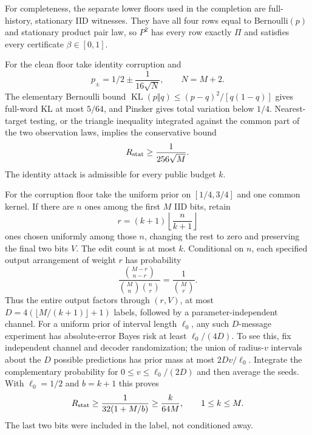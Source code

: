 For completeness, the separate lower floors used in the completion are full-history, stationary IID witnesses. They have all four rows equal to Bernoulli$(p)$ and stationary product pair law, so $P^2$ has every row exactly $\Pi$ and satisfies every certificate $\beta\in[0,1]$.

For the clean floor take identity corruption and
\[
 p_\pm=1/2\pm\frac1{16\sqrt{N}},\qquad N=M+2.
\]
The elementary Bernoulli bound $\operatorname{KL}(p\Vert q)\le(p-q)^2/[q(1-q)]$ gives full-word KL at most $5/64$, and Pinsker gives total variation below $1/4$. Nearest-target testing, or the triangle inequality integrated against the common part of the two observation laws, implies the conservative bound
\begin{equation}
 R_{\rm stat}\ge\frac1{256\sqrt M}.
 \label{bin:cleanfloor}
\end{equation}
The identity attack is admissible for every public budget $k$.

For the corruption floor take the uniform prior on $[1/4,3/4]$ and one common kernel. If there are $n$ ones among the first $M$ IID bits, retain
\[
 r=(k+1)\left\lfloor\frac n{k+1}\right\rfloor
\]
ones chosen uniformly among those $n$, changing the rest to zero and preserving the final two bits $V$. The edit count is at most $k$. Conditional on $n$, each specified output arrangement of weight $r$ has probability
\[
 \frac{\binom{M-r}{n-r}}{\binom Mn\binom nr}
       =\frac1{\binom Mr}.
\]
Thus the entire output factors through $(r,V)$, at most
$D=4(\lfloor M/(k+1)\rfloor+1)$ labels, followed by a parameter-independent channel. For a uniform prior of interval length $\ell_0$, any such $D$-message experiment has absolute-error Bayes risk at least $\ell_0/(4D)$. To see this, fix independent channel and decoder randomization; the union of radius-$v$ intervals about the $D$ possible predictions has prior mass at most $2Dv/\ell_0$. Integrate the complementary probability for $0\le v\le\ell_0/(2D)$ and then average the seeds. With $\ell_0=1/2$ and $b=k+1$ this proves
\begin{equation}
 R_{\rm stat}\ge\frac1{32(1+M/b)}\ge\frac{k}{64M},
 \qquad1\le k\le M.
 \label{bin:corruptionfloor}
\end{equation}
The last two bits were included in the label, not conditioned away.

